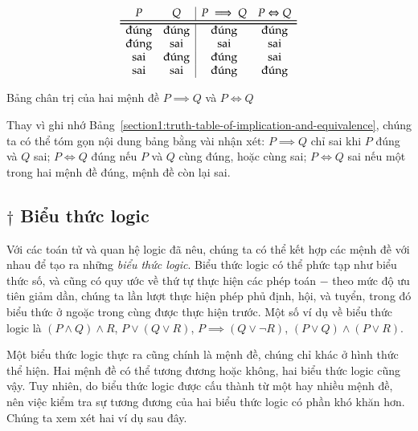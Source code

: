 \begin{table}[htp]
    \centering
    \[
        \begin{array}{cc|cc}
            P           & Q           & P\implies Q & P\Leftrightarrow Q \\
            \toprule
            \bottomrule
            \text{đúng} & \text{đúng} & \text{đúng} & \text{đúng}        \\
            \text{đúng} & \text{sai}  & \text{sai}  & \text{sai}         \\
            \text{sai}  & \text{đúng} & \text{đúng} & \text{sai}         \\
            \text{sai}  & \text{sai}  & \text{đúng} & \text{đúng}
        \end{array}
    \]
    \caption{Bảng chân trị của hai mệnh đề $P\implies Q$ và $P\Leftrightarrow Q$}\label{section1:truth-table-of-implication-and-equivalence}
\end{table}

Thay vì ghi nhớ Bảng~\ref{section1:truth-table-of-implication-and-equivalence}, chúng ta có thể tóm gọn nội dung bảng bằng vài nhận xét: $P\implies Q$ chỉ sai khi $P$ đúng và $Q$ sai; $P\Leftrightarrow Q$ đúng nếu $P$ và $Q$ cùng đúng, hoặc cùng sai; $P\Leftrightarrow Q$ sai nếu một trong hai mệnh đề đúng, mệnh đề còn lại sai.

\subsection{$\dagger$ Biểu thức logic}

Với các toán tử và quan hệ logic đã nêu, chúng ta có thể kết hợp các mệnh đề với nhau để tạo ra những \textit{biểu thức logic}. Biểu thức logic có thể phức tạp như biểu thức số, và cũng có quy ước về thứ tự thực hiện các phép toán $-$ theo mức độ ưu tiên giảm dần, chúng ta lần lượt thực hiện phép phủ định, hội, và tuyển, trong đó biểu thức ở ngoặc trong cùng được thực hiện trước. Một số ví dụ về biểu thức logic là $(P\wedge Q)\wedge R$, $P\vee (Q\vee R)$, $P \implies (Q\vee \neg R)$, $(P\vee Q) \wedge (P\vee R)$.

Một biểu thức logic thực ra cũng chính là mệnh đề, chúng chỉ khác ở hình thức thể hiện. Hai mệnh đề có thể tương đương hoặc không, hai biểu thức logic cũng vậy. Tuy nhiên, do biểu thức logic được cấu thành từ một hay nhiều mệnh đề, nên việc kiểm tra sự tương đương của hai biểu thức logic có phần khó khăn hơn. Chúng ta xem xét hai ví dụ sau đây.

